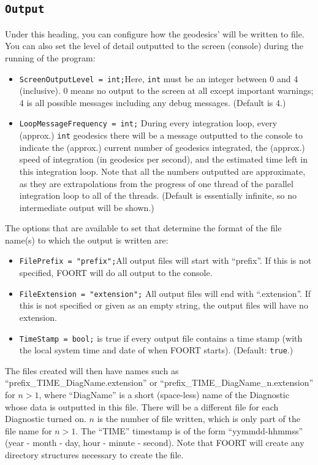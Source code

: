\documentclass[11pt,a4paper]{article}
\newcommand{\code}[1]{{\tt #1}}
\begin{document}
\subsection{\code{Output}}
Under this heading, you can configure how the geodesics' will be written to file. You can also set the level of detail outputted to the screen (console) during the running of the program:
\begin{itemize}
 \item \code{ScreenOutputLevel = int;}\newline Here, \code{int} must be an integer between 0 and 4 (inclusive). 0 means no output to the screen at all except important warnings; 4 is all possible messages including any debug messages. (Default is 4.)
 \item \code{LoopMessageFrequency = int;}\newline
 During every integration loop, every (approx.) \code{int} geodesics there will be a message outputted to the console to indicate the (approx.) current number of geodesics integrated, the (approx.) speed of integration (in geodesics per second), and the estimated time left in this integration loop. Note that all the numbers outputted are approximate, as they are extrapolations from the progress of one thread of the parallel integration loop to all of the threads.
 (Default is essentially infinite, so no intermediate output will be shown.)
\end{itemize}

The options that are available to set that determine the format of the file name(s) to which the output is written are:
\begin{itemize}
 \item \code{FilePrefix = "prefix";}\newline All output files will start with ``prefix''. If this is not specified, FOORT will do all output to the console.
 \item \code{FileExtension = "extension";} \newline All output files will end with ``.extension''. If this is not specified or given as an empty string, the output files will have no extension.
 \item \code{TimeStamp = bool;}\newline \code{bool} is true if every output file contains a time stamp (with the local system time and date of when FOORT starts). (Default: \code{true}.)
\end{itemize}
The files created will then have names such as ``prefix\_TIME\_DiagName.extension'' or ``prefix\_TIME\_DiagName\_n.extension'' for $n>1$, where ``DiagName'' is a short (space-less) name of the Diagnostic whose data is outputted in this file. There will be a different file for each Diagnostic turned on. $n$ is the number of file written, which is only part of the file name for $n>1$. The ``TIME'' timestamp is of the form ``yymmdd-hhmmss'' (year - month - day, hour - minute - second). Note that FOORT will create any directory structures necessary to create the file.
\end{document}
